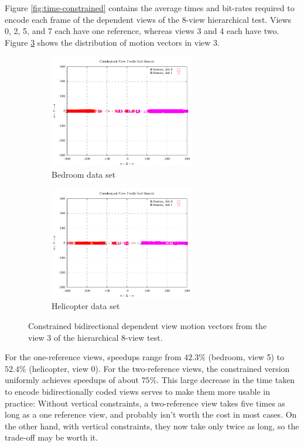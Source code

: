 \documentclass{sig-alternate-05-2015}
\begin{document}
Figure \ref{fig:time-constrained} contains the average times and bit-rates
required to encode each frame of the dependent views of the 8-view hierarchical
test. Views 0, 2, 5, and 7 each have one reference, whereas views 3 and 4 each
have two. Figure \ref{fig:inter-view-constrained-bimvs1} shows the distribution
of motion vectors in view 3.

\begin{figure}[h]
\centering
\begin{subfigure}{.5\textwidth}
\centering
\includegraphics[width=2.5in]{figures/bedroom1-inter-view-constrained-bimvs1.pdf}
\caption{Bedroom data set}
\label{fig:bedroom-inter-view-constrained-bimvs1}
\end{subfigure} \hspace{4pt}
\begin{subfigure}{.5\textwidth}
\centering
\includegraphics[width=2.5in]{figures/helicopter-inter-view-constrained-bimvs1.pdf}
\caption{Helicopter data set}
\label{fig:helicopter-inter-view-constrained-bimvs1}
\end{subfigure}
\caption{Constrained bidirectional dependent view motion vectors from the view 3
of the hierarchical 8-view test.}
\label{fig:inter-view-constrained-bimvs1}
\end{figure}

For the one-reference views, speedups range from $42.3\%$ (bedroom, view 5) to
$52.4\%$ (helicopter, view 0). For the two-reference views, the
constrained version uniformly achieves speedups of about $75\%$. This large
decrease in the time taken to encode bidirectionally coded views serves to
make them more usable in practice: Without vertical constraints, a
two-reference view takes five times as long as a one reference view, and
probably isn't worth the cost in most cases. On the other hand, with vertical
constraints, they now take only twice as long, so the trade-off may be worth it.
\end{document}
